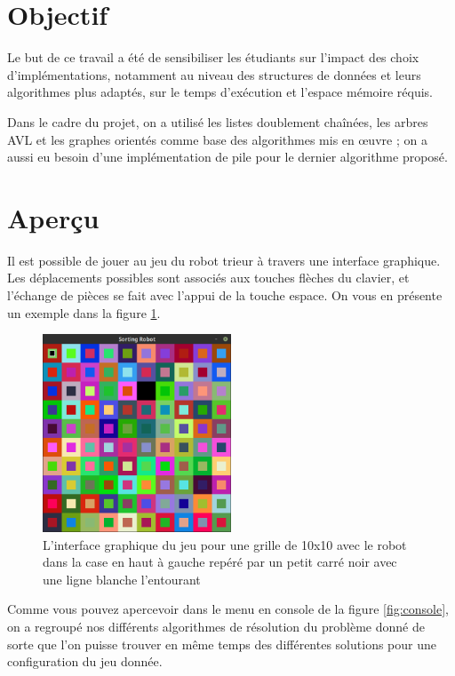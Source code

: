 \documentclass[12pt,a4paper]{article}
\begin{document}
\section*{Objectif}
Le but de ce travail a \'et\'e de sensibiliser les étudiants sur l'impact des 
choix d'impl\'ementations, notamment au niveau des structures de données et 
leurs algorithmes plus adapt\'es, sur le temps d'ex\'ecution et l'espace 
m\'emoire r\'equis.

Dans le cadre du projet, on a utilis\'e les listes doublement cha\^in\'ees, les 
arbres AVL et les graphes orient\'es comme base des algorithmes mis en \oe uvre 
; on a aussi eu besoin d'une impl\'ementation de pile pour le dernier 
algorithme propos\'e.

\section*{Aper\c{c}u}
Il est possible de jouer au jeu du robot trieur \`a travers une interface 
graphique. Les d\'eplacements possibles sont associ\'es aux touches 
fl\`eches du clavier, et l'\'echange de pi\`eces se fait avec l'appui de 
la touche espace. On vous en pr\'esente un exemple dans la figure \ref{fig:gui}.

\begin{figure}[!h]
  \centering
  \captionsetup{justification=centering}
  \includegraphics[width=0.5\textwidth]{gui}
  \caption[L'interface graphique du jeu]{L'interface graphique du jeu pour une 
  grille de 10x10 avec le robot dans la case en haut \`a gauche rep\'er\'e par 
un petit carr\'e noir avec une ligne blanche l'entourant}
  \label{fig:gui}
\end{figure}

Comme vous pouvez apercevoir dans le menu en console de la figure 
\ref{fig:console}, on a regroup\'e nos diff\'erents algorithmes de r\'esolution 
du probl\`eme donn\'e de sorte que l'on puisse trouver en m\^eme 
temps des diff\'erentes solutions pour une configuration du jeu donn\'ee.
\end{document}
